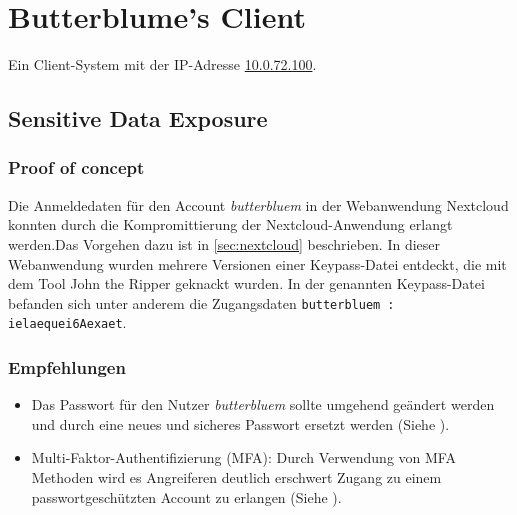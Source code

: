 \chapter{Butterblume's Client}
Ein Client-System mit der IP-Adresse \url{10.0.72.100}.

\section{\makecvssbadge Sensitive Data Exposure}

\subsection*{Proof of concept} 
Die Anmeldedaten für den Account \textit{butterbluem} in der Webanwendung Nextcloud konnten durch die Kompromittierung der Nextcloud-Anwendung erlangt werden.Das Vorgehen dazu ist in \autoref{sec:nextcloud} beschrieben. In dieser Webanwendung wurden mehrere Versionen einer Keypass-Datei entdeckt, die mit dem Tool John the Ripper geknackt wurden. In der genannten Keypass-Datei befanden sich unter anderem die Zugangsdaten \texttt{butterbluem : ielaequei6Aexaet}.

\subsection*{Empfehlungen}
\begin{itemize}
    \item Das Passwort für den Nutzer \textit{butterbluem} sollte umgehend geändert werden und durch eine neues und sicheres Passwort ersetzt werden (Siehe \cite{bsi_passwords}).
    \item Multi-Faktor-Authentifizierung (MFA): Durch Verwendung von MFA Methoden wird es Angreiferen deutlich erschwert Zugang zu einem passwortgeschützten Account zu erlangen (Siehe \cite{owaspAuthenticationOWASP}).
\end{itemize}


